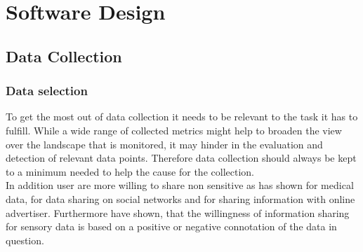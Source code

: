 \chapter{Software Design}
\label{chap:software_design}




%



\section{Data Collection}
\label{sec:software_design:data_collection}

    \subsection{Data selection}
        \label{subsec:software_design:selection}
        To get the most out of data collection it needs to be relevant to the task it has to fulfill.
        While a wide range of collected metrics might help to broaden the view over the landscape that is monitored, it may hinder in the evaluation and detection of relevant data points. Therefore data collection should always be kept to a minimum needed to help the cause for the collection.\\
        In addition user are more willing to share non sensitive as \cite{TODO} has shown for medical data, \cite{TODO} for data sharing on social networks and \cite{TODO} for sharing information with online advertiser. Furthermore \cite{TODO} have shown, that the willingness of information sharing for sensory data is based on a positive or negative connotation of the data in question.\\
        
